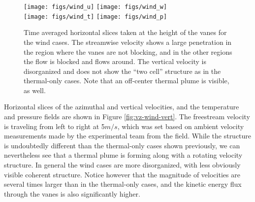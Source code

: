 %
%
\begin{figure}[htb]

  \centering
  \texttt{[image: figs/wind\_u]}
 \hfill
  \texttt{[image: figs/wind\_w]}
 \\
  \centering
  \texttt{[image: figs/wind\_t]}
 \hfill
  \texttt{[image: figs/wind\_p]}
 \caption{Time averaged horizontal slices taken at the height of the
 vanes for the wind cases. The streamwise velocity shows a large
 penetration in the region where the vanes are not blocking, and in the
 other regions the flow is blocked and flows around. The vertical
 velocity is disorganized and does not show the ``two cell'' structure
 as in the thermal-only cases.  Note that an
 off-center thermal plume is visible, as well.  } 
 \label{fig:wind-hor}
\end{figure}


Horizontal slices of the azimuthal and vertical velocities, and the 
temperature and pressure fields are shown in Figure
\ref{fig:vz-wind-vert}. The freestream velocity is traveling from left
to right at 5$ m/s$, which was set based on ambient velocity
measurements made by  the experimental team from the field. While the
structure is undoubtedly different than the thermal-only cases shown
previously, we can nevertheless see that a thermal plume is forming
along with a rotating velocity structure. In general the wind cases are
more disorganized, with less obviously visible coherent
structure. Notice however that the magnitude of velocities are several
times larger than in the thermal-only cases, and the kinetic energy
flux through the vanes is also significantly higher.  

%
%




